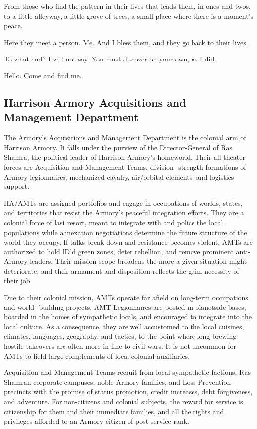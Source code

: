 {From those who find the pattern in their lives that leads them, in ones and twos, to a little
alleyway, a little grove of trees, a small place where there is a moment's peace.

Here they meet a person. Me. And I bless them, and they go back to their lives.

To what end? I will not say. You must discover on your own, as I did.

Hello. Come and find me.}

\subsection{Harrison Armory Acquisitions and Management Department}

The Armory's Acquisitions and Management Department is the colonial arm of Harrison Armory.
It falls under the purview of the Director-General of Ras Shamra, the political leader of Harrison
Armory's homeworld. Their all-theater forces are Acquisition and Management Teams, division-
strength formations of Armory legionnaires, mechanized cavalry, air/orbital elements, and
logistics support.

HA/AMTs are assigned portfolios and engage in occupations of worlds, states, and territories
that resist the Armory's peaceful integration efforts. They are a colonial force of last resort, meant
to integrate with and police the local populations while annexation negotiations determine the
future structure of the world they occupy. If talks break down and resistance becomes violent,
AMTs are authorized to hold ID'd green zones, deter rebellion, and remove prominent anti-
Armory leaders. Their mission scope broadens the more a given situation might deteriorate, and
their armament and disposition reflects the grim necessity of their job.

Due to their colonial mission, AMTs operate far afield on long-term occupations and world-
building projects. AMT Legionnaires are posted in planetside bases, boarded in the homes of
sympathetic locals, and encouraged to integrate into the local culture. As a consequence, they
are well accustomed to the local cuisines, climates, languages, geography, and tactics, to the
point where long-brewing hostile takeovers are often more in-line to civil wars. It is not
uncommon for AMTs to field large complements of local colonial auxiliaries.

Acquisition and Management Teams recruit from local sympathetic factions, Ras Shamran
corporate campuses, noble Armory families, and Loss Prevention precincts with the promise of
status promotion, credit increases, debt forgiveness, and adventure. For non-citizens and
colonial subjects, the reward for service is citizenship for them and their immediate families, and
all the rights and privileges afforded to an Armory citizen of post-service rank.

